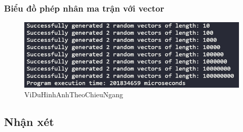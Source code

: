\newpage
\subsubsection{Biểu đồ phép nhân ma trận với vector}


\begin{figure}[h] %
    \centering
    \includegraphics[width=1\textwidth]{pictures/image.png} %
    \caption{ViDuHinhAnhTheoChieuNgang} %
    \label{pictures:nghia12} %
\end{figure}


\subsection{Nhận xét}
\lipsum[1]


